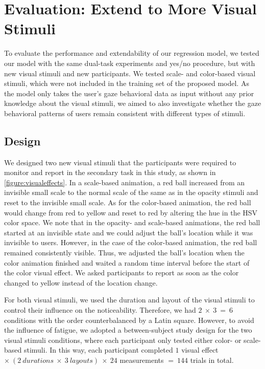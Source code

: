 \section{Evaluation: Extend to More Visual Stimuli}
\label{section:evaluation}

To evaluate the performance and extendability of our regression model, we tested our model with the same dual-task experiments and yes/no procedure, but with new visual stimuli and new participants.
We tested scale- and color-based visual stimuli, which were not included in the training set of the proposed model.
As the model only takes the user's gaze behavioral data as input without any prior knowledge about the visual stimuli, we aimed to also investigate whether the gaze behavioral patterns of users remain consistent with different types of stimuli.

\subsection{Design}

We designed two new visual stimuli that the participants were required to monitor and report in the secondary task in this study, as shown in \autoref{figure:visualeffects}.
In a scale-based animation, a red ball increased from an invisible small scale to the normal scale of the same as in the opacity stimuli and reset to the invisible small scale.
As for the color-based animation, the red ball would change from red to yellow and reset to red by altering the hue in the HSV color space.
We note that in the opacity- and scale-based animations, the red ball started at an invisible state and we could adjust the ball's location while it was invisible to users.
However, in the case of the color-based animation, the red ball remained consistently visible.
Thus, we adjusted the ball's location when the color animation finished and waited a random time interval before the start of the color visual effect.
We asked participants to report as soon as the color changed to yellow instead of the location change.

For both visual stimuli, we used the duration and layout of the visual stimuli to control their influence on the noticeability.
Therefore, we had $2~\times~3~=~6$ conditions with the order counterbalanced by a Latin square.
However, to avoid the influence of fatigue, we adopted a between-subject study design for the two visual stimuli conditions, where each participant only tested either color- or scale-based stimuli.
In this way, each participant completed $1$ visual effect $\times~(2~durations~\times~3~layouts)~\times~24$ measurements $=~144$ trials in total. 

